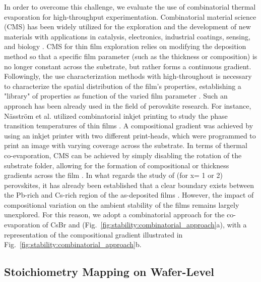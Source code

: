 In order to overcome this challenge, we evaluate the use of combinatorial thermal evaporation for high-throughput experimentation. Combinatorial material science (CMS) has been widely utilized for the exploration and the development of new materials with applications in catalysis, electronics, industrial coatings, sensing, and biology \cite{Potyrailo2011CombinatorialArt}. CMS for thin film exploration relies on modifying the deposition method so that a specific film parameter (such as the thickness or composition) is no longer constant across the substrate, but rather forms a continuous gradient. Followingly, the use characterization methods with high-throughout is necessary to characterize the spatial distribution of the film's properties, establishing a "library" of properties as function of the varied film parameter \cite{McGinn2019Thin-filmReview, Xiang1999CombinatorialMaterials, Ludwig2019DiscoveryMethods}. Such an approach has been already used in the field of perovskite research. For instance, Näsström et al. utilized combinatorial inkjet printing to study the phase transition temperatures of  thin films \cite{Nasstrom2020Dependence}. A compositional gradient was achieved by using an inkjet printer with two different print-heads, which were programmed to print an image with varying coverage across the substrate. In terms of thermal co-evaporation, CMS can be achieved by simply disabling the rotation of the substrate folder, allowing for the formation of compositional or thickness gradients across the film  \cite{Becker2019LowExperimentation, Susic2023CombinatorialCells, Lin2024FormationTreatment, Huang2021Vapor-deposited16, Li2019High-ThroughputDeposition}. In what regards the study of   (for x= 1 or 2) perovskites, it has already been established that a clear boundary exists between the Pb-rich and Cs-rich region of the as-deposited films \cite{Becker2019LowExperimentation, Huang2021Vapor-deposited16, Lin2024FormationTreatment}. However, the impact of compositional variation on the ambient stability of the films remains largely unexplored. For this reason, we adopt a combinatorial approach for the co-evaporation of CsBr and  (Fig.~\ref{fig:stability:combinatorial_approach}a), with a representation of the compositional gradient illustrated in Fig.~\ref{fig:stability:combinatorial_approach}b.


\subsection{Stoichiometry Mapping on Wafer-Level}



